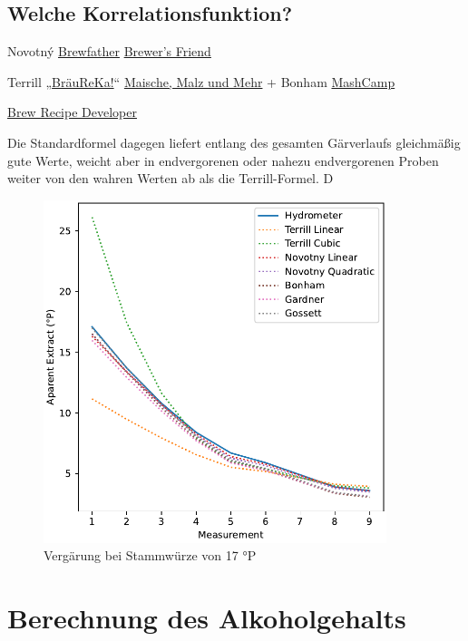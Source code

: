 \documentclass[a4paper,parskip=half]{scrartcl}
\begin{document}

\subsection*{Welche Korrelationsfunktion?}

Novotný
\href{https://brewfather.app}{Brewfather}
\href{https://www.brewersfriend.com/refractometer-calculator}{Brewer's Friend}

Terrill
„\href{https://braureka.de/berechnungen/refraktometer-korrektur/}{BräuReKa!}“
\href{https://www.maischemalzundmehr.de/index.php?inhaltmitte=toolsrefraktorechner}{Maische, Malz und Mehr} + Bonham
\href{https://mashcamp.shop/brauberechnungen}{MashCamp}

\href{http://www.brewrecipedeveloper.de}{Brew Recipe Developer}

Die Standardformel dagegen liefert entlang des gesamten Gärverlaufs gleichmäßig gute Werte, weicht aber in endvergorenen oder nahezu endvergorenen Proben weiter von den wahren Werten ab als die Terrill-Formel. D
\autocite{Weiss2016}

\begin{figure}[h]
\centering
\includegraphics[width=10cm]{data_fermentation_graph.pdf}
\caption{Vergärung bei Stammwürze von 17 °P}
\label{fig:novotnydataset}
\end{figure}

\section*{Berechnung des Alkoholgehalts}
\end{document}
